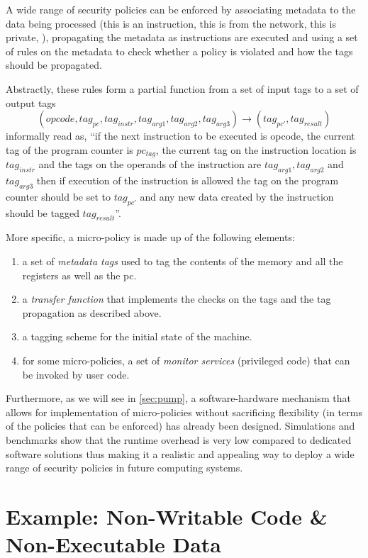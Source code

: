 A wide range of security policies can be enforced by associating metadata
to the data being processed (\EG this is an instruction, this is from the
network, this is private, \ETC), propagating the metadata as
instructions are executed and using a set of rules on the metadata to check
whether a policy is violated and how the tags should be propagated.

Abstractly, these rules form a partial function from a set of
input tags to a set of output tags
$$(opcode, tag_{pc},tag_{instr}, tag_{arg1}, tag_{arg2}, tag_{arg3})
\rightarrow (tag_{pc'},tag_{result})$$
informally read as, ``if the next instruction to be executed is opcode, the
current tag of the program counter is $pc_{tag}$, the current tag on the
instruction location is $tag_{instr}$ and the tags on the operands of the
instruction are $tag_{arg1}, tag_{arg2}$ and $tag_{arg3}$ then if execution of
the instruction is allowed the tag on the program counter should be set
to $tag_{pc'}$ and any new data created by the instruction should be tagged
$tag_{result}$''.

More specific, a micro-policy is made up of the following elements:
\begin{enumerate}
\item a set of {\em metadata tags} used to tag the contents of the memory and
all the registers as well as the pc.
\item a {\em transfer function} that implements the checks on the tags and
the tag propagation as described above.
\item a tagging scheme for the initial state of the machine.
\item for some micro-policies, a set of {\em monitor services} (\IE privileged
code) that can be invoked by user code.
\end{enumerate}

Furthermore, as we will see in \ref{sec:pump}, a software-hardware
mechanism that allows for implementation of micro-policies without
sacrificing flexibility (in terms of the policies that can be
enforced) has already been designed. Simulations and benchmarks show
that the runtime overhead is very low compared to dedicated software
solutions thus making it a realistic and appealing way to deploy a
wide range of security policies in future computing systems.

\section{Example:
  Non-Writable Code \& Non-Executable Data}
\label{sec:nwc_nxd}


